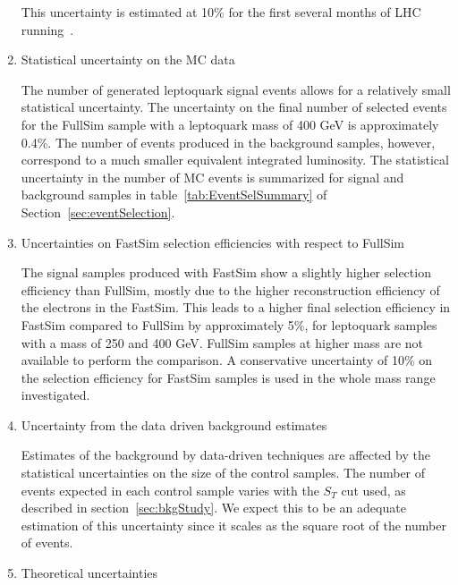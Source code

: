 \begin{enumerate}
This uncertainty is estimated at 10\% for the first several months of LHC running~\cite{PTDR}. 
%
\item Statistical uncertainty on the MC data

The number of generated leptoquark signal events allows for a relatively small statistical uncertainty.
The uncertainty on the final number of selected events for the FullSim sample with a leptoquark mass of 400 GeV is 
approximately 0.4\%.  The number of events produced in the background samples, however, correspond to a much
smaller equivalent integrated luminosity.  
The statistical uncertainty in the number of MC events is summarized for signal and background samples 
in table~\ref{tab:EventSelSummary} of Section~\ref{sec:eventSelection}.  
%
\item Uncertainties on FastSim selection efficiencies with respect to FullSim

The signal samples produced with FastSim show a slightly higher selection efficiency than FullSim, 
mostly due to the higher reconstruction efficiency of the electrons in the FastSim. 
This leads to a higher final selection efficiency in FastSim compared to FullSim by approximately 5\%, 
for leptoquark samples with a mass of 250 and 400 GeV. FullSim samples at higher mass are not available 
to perform the comparison. A conservative uncertainty of 10\% on the selection efficiency 
for FastSim samples is used in the whole mass range investigated. 
%
\item Uncertainty from the data driven background estimates

Estimates of the background by data-driven techniques are affected by the statistical
uncertainties on the size of the control samples.
The number of events expected in each control sample varies with the $S_T$ cut used, as 
described in section~\ref{sec:bkgStudy}. 
We expect this to be an adequate estimation of this
uncertainty since it scales as the square root of the number of events.


\item Theoretical uncertainties 


\end{enumerate}
